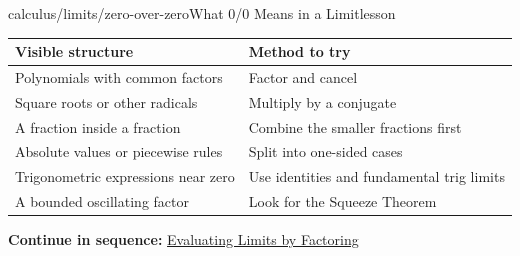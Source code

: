 \documentclass[11pt,openany]{book}
\theoremstyle{bgplain}
\newcommand{\webnext}[2]{%
  \par\addvspace{1.2em}\noindent{\color{BGLine}\rule{\textwidth}{0.35pt}}\par\smallskip
  {\small\color{BGGray}\textbf{Continue in sequence:} \hyperlink{web:#1}{#2}}\par
}
\begin{document}
\begin{webpage}{calculus/limits/zero-over-zero}{What 0/0 Means in a Limit}{lesson}
\begin{bghomework}[title={Method Selection After \(0/0\)}]
\begin{center}
\begin{tabularx}{\textwidth}{@{}p{}X@{}}
\toprule
\textbf{Visible structure} & \textbf{Method to try}\\
\midrule
Polynomials with common factors & Factor and cancel\\
Square roots or other radicals & Multiply by a conjugate\\
A fraction inside a fraction & Combine the smaller fractions first\\
Absolute values or piecewise rules & Split into one-sided cases\\
Trigonometric expressions near zero & Use identities and fundamental trig limits\\
A bounded oscillating factor & Look for the Squeeze Theorem\\
\bottomrule
\end{tabularx}
\end{center}
\end{bghomework}
\webnext{calculus/limits/factoring-limits}{Evaluating Limits by Factoring}
\end{webpage}
\end{document}
